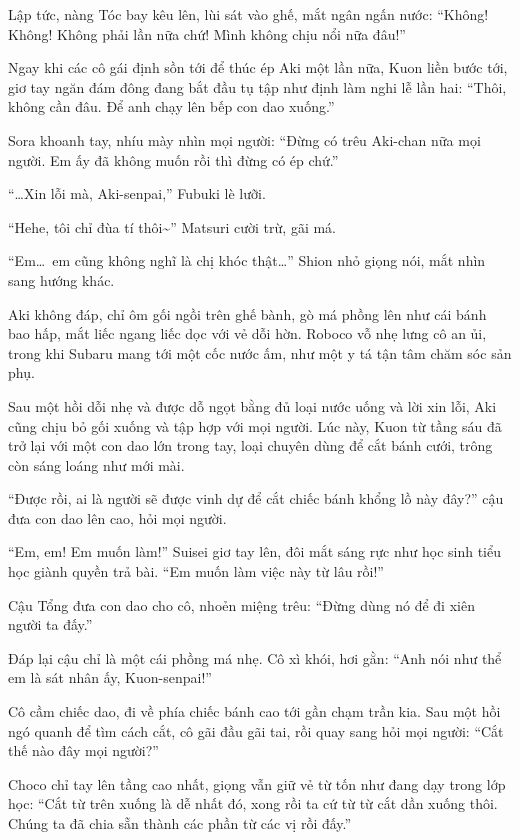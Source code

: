 \documentclass[../main.tex]{subfiles}
\begin{document}
Lập tức, nàng Tóc bay kêu lên, lùi sát vào ghế, mắt ngân ngấn nước: ``Không! Không! Không phải lần nữa chứ! Mình không chịu nổi nữa đâu!''

Ngay khi các cô gái định sồn tới để thúc ép Aki một lần nữa, Kuon liền bước tới, giơ tay ngăn đám đông đang bắt đầu tụ tập như định làm nghi lễ lần hai: ``Thôi, không cần đâu. Để anh chạy lên bếp con dao xuống.''

Sora khoanh tay, nhíu mày nhìn mọi người: ``Đừng có trêu Aki-chan nữa mọi người. Em ấy đã không muốn rồi thì đừng có ép chứ.''

``\dots Xin lỗi mà, Aki-senpai,'' Fubuki lè lưỡi.

``Hehe, tôi chỉ đùa tí thôi\~{}'' Matsuri cười trừ, gãi má.

``Em\dots\ em cũng không nghĩ là chị khóc thật\dots'' Shion nhỏ giọng nói, mắt nhìn sang hướng khác.

Aki không đáp, chỉ ôm gối ngồi trên ghế bành, gò má phồng lên như cái bánh bao hấp, mắt liếc ngang liếc dọc với vẻ dỗi hờn. Roboco vỗ nhẹ lưng cô an ủi, trong khi Subaru mang tới một cốc nước ấm, như một y tá tận tâm chăm sóc sản phụ.

\ct

Sau một hồi dỗi nhẹ và được dỗ ngọt bằng đủ loại nước uống và lời xin lỗi, Aki cũng chịu bỏ gối xuống và tập hợp với mọi người. Lúc này, Kuon từ tầng sáu đã trở lại với một con dao lớn trong tay, loại chuyên dùng để cắt bánh cưới, trông còn sáng loáng như mới mài.

``Được rồi, ai là người sẽ được vinh dự để cắt chiếc bánh khổng lồ này đây?'' cậu đưa con dao lên cao, hỏi mọi người.

``Em, em! Em muốn làm!'' Suisei giơ tay lên, đôi mắt sáng rực như học sinh tiểu học giành quyền trả bài. ``Em muốn làm việc này từ lâu rồi!''

Cậu Tổng đưa con dao cho cô, nhoẻn miệng trêu: ``Đừng dùng nó để đi xiên người ta đấy.''

Đáp lại cậu chỉ là một cái phồng má nhẹ. Cô xì khói, hơi gằn: ``Anh nói như thể em là sát nhân ấy, Kuon-senpai!''

Cô cầm chiếc dao, đi về phía chiếc bánh cao tới gần chạm trần kia. Sau một hồi ngó quanh để tìm cách cắt, cô gãi đầu gãi tai, rồi quay sang hỏi mọi người: ``Cắt thế nào đây mọi người?''

Choco chỉ tay lên tầng cao nhất, giọng vẫn giữ vẻ từ tốn như đang dạy trong lớp học: ``Cắt từ trên xuống là dễ nhất đó, xong rồi ta cứ từ từ cắt dần xuống thôi. Chúng ta đã chia sẵn thành các phần từ các vị rồi đấy.''
\end{document}
